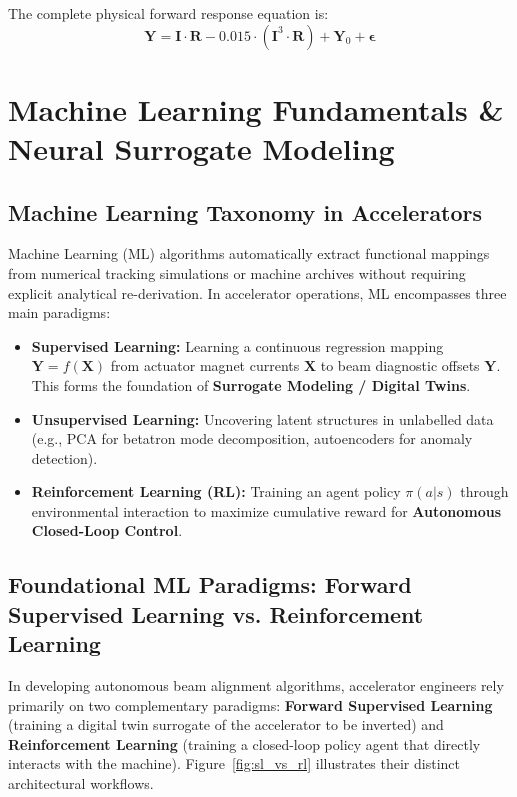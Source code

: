 \documentclass[11pt,a4paper]{article}
\begin{document}
The complete physical forward response equation is:
\begin{equation}
    \mathbf{Y} = \mathbf{I} \cdot \mathbf{R} - 0.015 \cdot (\mathbf{I}^3 \cdot \mathbf{R}) + \mathbf{Y}_0 + \boldsymbol{\epsilon}
\end{equation}


\section{Machine Learning Fundamentals \& Neural Surrogate Modeling}

\subsection{Machine Learning Taxonomy in Accelerators}
Machine Learning (ML) algorithms automatically extract functional mappings from numerical tracking simulations or machine archives without requiring explicit analytical re-derivation. In accelerator operations, ML encompasses three main paradigms:
\begin{itemize}
    \item \textbf{Supervised Learning:} Learning a continuous regression mapping $\mathbf{Y} = f(\mathbf{X})$ from actuator magnet currents $\mathbf{X}$ to beam diagnostic offsets $\mathbf{Y}$. This forms the foundation of \textbf{Surrogate Modeling / Digital Twins}.
    \item \textbf{Unsupervised Learning:} Uncovering latent structures in unlabelled data (e.g., PCA for betatron mode decomposition, autoencoders for anomaly detection).
    \item \textbf{Reinforcement Learning (RL):} Training an agent policy $\pi(a|s)$ through environmental interaction to maximize cumulative reward for \textbf{Autonomous Closed-Loop Control}.
\end{itemize}

\subsection{Foundational ML Paradigms: Forward Supervised Learning vs. Reinforcement Learning}
In developing autonomous beam alignment algorithms, accelerator engineers rely primarily on two complementary paradigms: \textbf{Forward Supervised Learning} (training a digital twin surrogate of the accelerator to be inverted) and \textbf{Reinforcement Learning} (training a closed-loop policy agent that directly interacts with the machine). Figure~\ref{fig:sl_vs_rl} illustrates their distinct architectural workflows.
\end{document}
